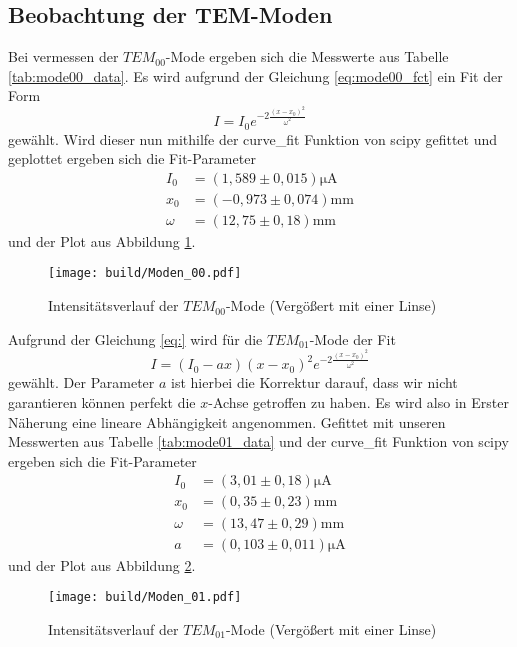 
\subsection{Beobachtung der TEM-Moden}
Bei vermessen der $TEM_{00}$-Mode ergeben sich die Messwerte aus Tabelle \ref{tab:mode00_data}. 
Es wird aufgrund der Gleichung \eqref{eq:mode00_fct} ein Fit der Form
\begin{equation}
  I=I_0e^{-2\frac{(x-x_0)^2}{\omega^2}}
\end{equation}
gewählt. Wird dieser nun mithilfe der curve\_fit Funktion von scipy \cite{scipy} gefittet und geplottet ergeben sich die Fit-Parameter
\begin{align}
  I_0&=(1,589\pm0,015)\si{\micro\ampere}\nonumber\\
  x_0&=(-0,973\pm0,074)\si{\milli\meter}\nonumber\\
  \omega&=(12,75\pm0,18)\si{\milli\meter}
\end{align}
und der Plot aus Abbildung \ref{fig:Mode_00}.
\begin{figure}
  \centering
  \texttt{[image: build/Moden\_00.pdf]}
  \caption{Intensitätsverlauf der $TEM_{00}$-Mode (Vergößert mit einer Linse)}
  \label{fig:Mode_00}
\end{figure}
Aufgrund der Gleichung \eqref{eq:} wird für die $TEM_{01}$-Mode der Fit 
\begin{equation}
  I=(I_0-ax)(x-x_0)^2e^{-2\frac{(x-x_0)^2}{\omega^2}}
\end{equation}
gewählt. Der Parameter $a$ ist hierbei die Korrektur darauf, dass wir nicht garantieren können perfekt die $x$-Achse getroffen zu haben.
Es wird also in Erster Näherung eine lineare Abhängigkeit angenommen.
Gefittet mit unseren Messwerten aus Tabelle \ref{tab:mode01_data} und der curve\_fit Funktion von scipy \cite{scipy} ergeben sich die Fit-Parameter 
\begin{align}
  I_0&=(3,01\pm0,18)\si{\micro\ampere}\nonumber\\
  x_0&=(0,35\pm0,23)\si{\milli\meter}\nonumber\\
  \omega&=(13,47\pm0,29)\si{\milli\meter}\nonumber\\
  a&=(0,103\pm0,011)\si{\micro\ampere}
\end{align}
und der Plot aus Abbildung \ref{fig:Mode_01}.

\begin{figure}
  \centering
  \texttt{[image: build/Moden\_01.pdf]}
  \caption{Intensitätsverlauf der $TEM_{01}$-Mode (Vergößert mit einer Linse)}
  \label{fig:Mode_01}
\end{figure}


